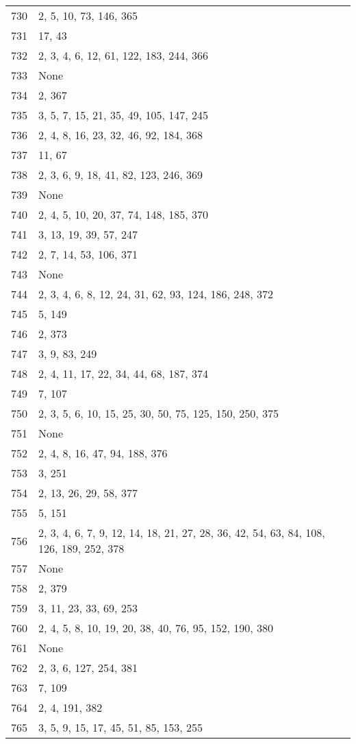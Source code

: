 \documentclass[12pt]{article}
\begin{document}
\begin{tabular}{|r|l|}
730 & 2,  5, 10, 73, 146, 365 \\ 
731 & 17, 43 \\ 
732 & 2,  3, 4, 6, 12, 61, 122, 183, 244, 366 \\ 
733 & None \\ 
734 & 2, 367 \\ 
735 & 3, 5, 7, 15, 21, 35, 49, 105, 147, 245 \\ 
736 & 2, 4, 8, 16, 23, 32, 46, 92, 184, 368 \\ 
737 & 11, 67 \\ 
738 & 2, 3, 6, 9, 18, 41, 82, 123, 246, 369 \\ 
739 & None \\ 
740 & 2,  4, 5, 10, 20, 37, 74, 148, 185, 370 \\ 
741 & 3, 13, 19, 39, 57, 247 \\ 
742 & 2, 7, 14, 53, 106, 371 \\ 
743 & None \\ 
744 & 2, 3, 4, 6, 8, 12, 24, 31, 62, 93, 124, 186, 248, 372 \\ 
745 & 5, 149 \\ 
746 & 2, 373 \\ 
747 & 3, 9, 83, 249 \\ 
748 & 2, 4, 11, 17, 22, 34, 44, 68, 187, 374 \\ 
749 & 7, 107 \\ 
750 & 2, 3, 5, 6, 10, 15, 25, 30, 50, 75, 125, 150, 250, 375 \\ 
751 & None \\ 
752 & 2, 4, 8, 16, 47, 94,  188, 376 \\ 
753 & 3, 251 \\ 
754 & 2, 13, 26, 29, 58, 377 \\ 
755 & 5, 151 \\ 
756 & 2, 3, 4, 6, 7, 9, 12, 14, 18,  21, 27, 28, 36, 42, 54, 63, 84, 108, 126, 189, 252, 378 \\ 
757 & None \\ 
758 & 2, 379 \\ 
759 & 3, 11, 23, 33, 69, 253 \\ 
760 & 2, 4, 5, 8, 10, 19, 20, 38, 40, 76, 95, 152, 190, 380 \\ 
761 & None \\ 
762 & 2, 3, 6, 127, 254, 381 \\ 
763 & 7,  109 \\ 
764 & 2, 4,  191, 382 \\ 
765 & 3, 5, 9, 15, 17, 45, 51, 85, 153, 255 \\ 

\end{tabular}
\end{document}
